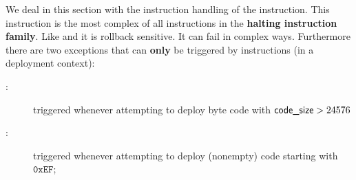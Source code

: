 We deal in this section with the instruction handling of the  instruction.
This instruction is the most complex of all instructions in the \textbf{halting instruction family}.
Like  and  it is rollback sensitive.
It can fail in complex ways.
Furthermore there are two exceptions that can \textbf{only} be triggered by  instructions (in a deployment context):
\begin{description}
	\item[\maxcsxSH{}:]
		triggered whenever attempting to deploy byte code with $ \textsf{code\_size} >24576 $
	\item[\icpxSH{}:]
		triggered whenever attempting to deploy (nonempty) code starting with $\texttt{0xEF}$;
\end{description}
